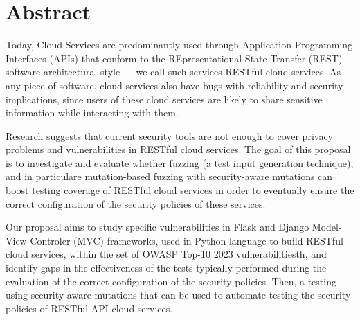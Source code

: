 \chapter*{Abstract}
%

Today, Cloud Services are predominantly used through Application Programming Interfaces (APIs) that conform to the
REpresentational State Transfer (REST) software architectural style --- we call such services RESTful cloud services.
As any piece of software, cloud services also have bugs with reliability and security implications, since
users of these cloud services are likely to share sensitive information while interacting with them.

Research suggests that current security tools are not enough to cover privacy problems and vulnerabilities in RESTful cloud services.
The goal of this proposal is to investigate and evaluate whether fuzzing (a test input generation technique), and in particulare
mutation-based fuzzing with security-aware mutations can boost testing coverage of RESTful cloud services in order to eventually
ensure the correct configuration of the security policies of these services.

Our proposal aims to study specific vulnerabilities in Flask and Django Model-View-Controler (MVC) frameworks, used in
Python language to build RESTful cloud services, within the set of OWASP Top-10 2023 vulnerabilitiesth, 
and identify gaps in the effectiveness of the tests typically performed during the evaluation of the correct configuration of the security policies.
Then, a testing using security-aware mutations that can be used to automate testing the security policies of RESTful API cloud services.

